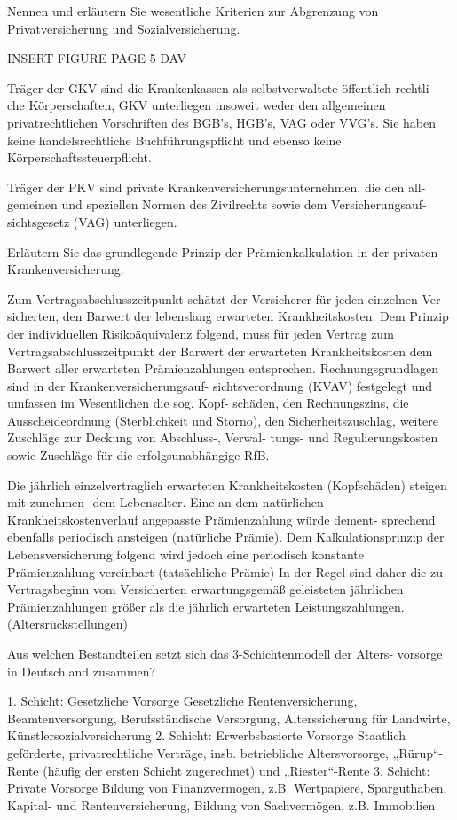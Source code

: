 Nennen und erläutern Sie wesentliche Kriterien zur Abgrenzung von
Privatversicherung und Sozialversicherung.

INSERT FIGURE PAGE 5 DAV

Träger der GKV sind die Krankenkassen als selbstverwaltete öffentlich rechtli-
che Körperschaften, GKV unterliegen insoweit weder den allgemeinen privatrechtlichen Vorschriften
des BGB's, HGB's, VAG oder VVG's. Sie haben keine handelsrechtliche
Buchführungspflicht und ebenso keine Körperschaftssteuerpflicht.

Träger der PKV sind private Krankenversicherungsunternehmen, die den all-
gemeinen und speziellen Normen des Zivilrechts sowie dem Versicherungsauf-
sichtsgesetz (VAG) unterliegen.


Erläutern Sie das grundlegende Prinzip der Prämienkalkulation in der
privaten Krankenversicherung.

Zum Vertragsabschlusszeitpunkt schätzt der Versicherer für jeden einzelnen Ver-
sicherten, den Barwert der lebenslang erwarteten Krankheitskosten. Dem Prinzip
der individuellen Risikoäquivalenz folgend, muss für jeden Vertrag zum Vertragsabschlusszeitpunkt 
der Barwert der erwarteten Krankheitskosten dem Barwert aller erwarteten Prämienzahlungen entsprechen.
Rechnungsgrundlagen sind in der Krankenversicherungsauf-
sichtsverordnung (KVAV) festgelegt und umfassen im Wesentlichen die sog. Kopf-
schäden, den Rechnungszins, die Ausscheideordnung (Sterblichkeit und Storno),
den Sicherheitszuschlag, weitere Zuschläge zur Deckung von Abschluss-, Verwal-
tungs- und Regulierungskosten sowie Zuschläge für die erfolgsunabhängige RfB.

Die jährlich einzelvertraglich erwarteten Krankheitskosten (Kopfschäden) steigen mit zunehmen-
dem Lebensalter. 
Eine an dem natürlichen Krankheitskostenverlauf angepasste Prämienzahlung würde dement-
sprechend ebenfalls periodisch ansteigen (natürliche Prämie). 
Dem Kalkulationsprinzip der Lebensversicherung folgend wird jedoch eine periodisch konstante
Prämienzahlung vereinbart (tatsächliche Prämie)
In der Regel sind daher die zu Vertragsbeginn vom Versicherten
erwartungsgemäß geleisteten jährlichen Prämienzahlungen größer als die jährlich
erwarteten Leistungszahlungen. (Altersrückstellungen)



Aus welchen Bestandteilen setzt sich das 3-Schichtenmodell der Alters-
vorsorge in Deutschland zusammen?

1. Schicht: Gesetzliche Vorsorge
Gesetzliche Rentenversicherung, Beamtenversorgung, Berufsständische
Versorgung, Alterssicherung für Landwirte, Künstlersozialversicherung
2. Schicht: Erwerbsbasierte Vorsorge
Staatlich geförderte, privatrechtliche Verträge, insb. betriebliche Altersvorsorge,
„Rürup“-Rente (häufig der ersten Schicht zugerechnet) und „Riester“-Rente
3. Schicht: Private Vorsorge
Bildung von Finanzvermögen, z.B. Wertpapiere, Sparguthaben,
Kapital- und Rentenversicherung, Bildung von Sachvermögen, z.B. Immobilien


